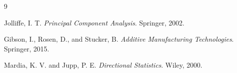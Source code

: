 \documentclass[11pt,a4paper]{article}
\begin{document}

\begin{thebibliography}{9}

Jolliffe, I. T.
\textit{Principal Component Analysis}.
Springer, 2002.

Gibson, I., Rosen, D., and Stucker, B.
\textit{Additive Manufacturing Technologies}.
Springer, 2015.

Mardia, K. V. and Jupp, P. E.
\textit{Directional Statistics}.
Wiley, 2000.

\end{thebibliography}
\end{document}
